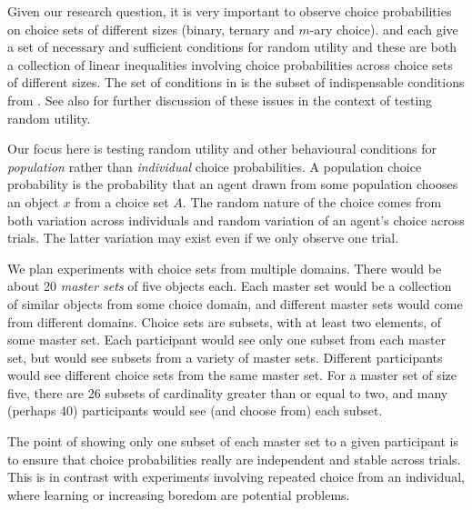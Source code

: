 \documentclass[11pt,letter]{amsart}
\begin{document}
Given our research question, it is very important to observe choice probabilities on choice sets of different sizes (binary, ternary and $m$-ary choice).
 and  each give a set of necessary and sufficient conditions for random utility and these are both a collection of linear inequalities involving choice probabilities across choice sets of different sizes.
The set of conditions in  is the subset of indispensable conditions from .
See also  for further discussion of these issues in the context of testing random utility.

Our focus here is testing random utility and other behavioural conditions for {\em population} rather than {\em individual} choice probabilities.
A population choice probability is the probability that an agent drawn from some population chooses an object $x$ from a choice set $A$.
The random nature of the choice comes from both variation across individuals and random variation of an agent's choice across trials.
The latter variation may exist even if we only observe one trial.

We plan experiments with choice sets from multiple domains.
There would be about 20 {\em master sets} of five objects each.
Each master set would be a collection of similar objects from some choice domain,
and different master sets would come from different domains.
Choice sets are subsets, with at least two elements, of some master set.
Each participant would see only one subset from each master set, but would see subsets from a variety of master sets.
Different participants would see different choice sets from the same master set.
For a master set of size five, there are 26 subsets of cardinality greater than or equal to two, and many (perhaps 40) participants would see (and choose from) each subset.

The point of showing only one subset of each master set to a given participant is to ensure that choice probabilities really are independent and stable across trials.
This is in contrast with experiments involving repeated choice from an individual, where learning or increasing boredom are potential problems.
\end{document}
